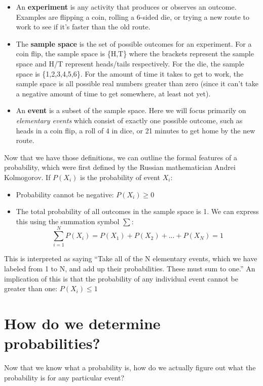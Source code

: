 \documentclass[]{book}
\providecommand{\tightlist}{%
  \setlength{\itemsep}{0pt}\setlength{\parskip}{0pt}}
\theoremstyle{definition}
\theoremstyle{definition}
\theoremstyle{definition}
\theoremstyle{remark}
\begin{document}
\begin{itemize}
\tightlist
\item
  An \textbf{experiment} is any activity that produces or observes an
  outcome. Examples are flipping a coin, rolling a 6-sided die, or
  trying a new route to work to see if it's faster than the old route.
\item
  The \textbf{sample space} is the set of possible outcomes for an
  experiment. For a coin flip, the sample space is \{H,T\} where the
  brackets represent the sample space and H/T represent heads/tails
  respectively. For the die, the sample space is \{1,2,3,4,5,6\}. For
  the amount of time it takes to get to work, the sample space is all
  possible real numbers greater than zero (since it can't take a
  negative amount of time to get somewhere, at least not yet).
\item
  An \textbf{event} is a subset of the sample space. Here we will focus
  primarily on \emph{elementary events} which consist of exactly one
  possible outcome, such as heads in a coin flip, a roll of 4 in dice,
  or 21 minutes to get home by the new route.
\end{itemize}

Now that we have those definitions, we can outline the formal features
of a probability, which were first defined by the Russian mathematician
Andrei Kolmogorov. If \(P(X_i)\) is the probability of event \(X_i\):

\begin{itemize}
\tightlist
\item
  Probability cannot be negative: \(P(X_i) \ge 0\)
\item
  The total probability of all outcomes in the sample space is 1. We can
  express this using the summation symbol \(\sum\): \[
  \sum_{i=1}^N{P(X_i)} = P(X_1) + P(X_2) + ... + P(X_N) = 1
  \]
\end{itemize}

This is interpreted as saying ``Take all of the N elementary events,
which we have labeled from 1 to N, and add up their probabilities. These
must sum to one.'' An implication of this is that the probability of any
individual event cannot be greater than one: \(P(X_i)\le 1\)

\section{How do we determine
probabilities?}\label{how-do-we-determine-probabilities}

Now that we know what a probability is, how do we actually figure out
what the probability is for any particular event?
\end{document}
